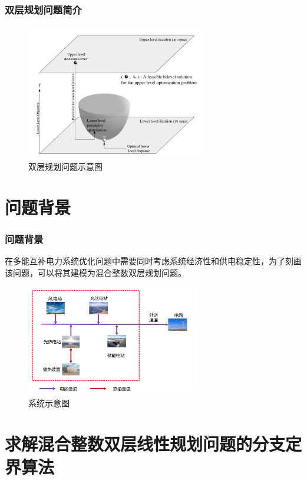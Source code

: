\documentclass[10pt]{beamer}
\begin{document}
\begin{frame}
	\frametitle{双层规划问题简介}
	\begin{figure}
		\centering
		\includegraphics[width=0.7\textwidth]{pic/双层问题示意图.png}
		\caption{双层规划问题示意图}
	\end{figure}
\end{frame}

\section{问题背景}

\begin{frame}
	\frametitle{问题背景} 
	在多能互补电力系统优化问题中需要同时考虑系统经济性和供电稳定性，为了刻画该问题，可以将其建模为混合整数双层规划问题。
	\begin{figure}
		\centering
		\includegraphics[width=0.65\textwidth]{pic/系统结构示意图.png}
		\caption{系统示意图}
	\end{figure}
\end{frame}

\section{求解混合整数双层线性规划问题的分支定界算法} 
\end{document}
